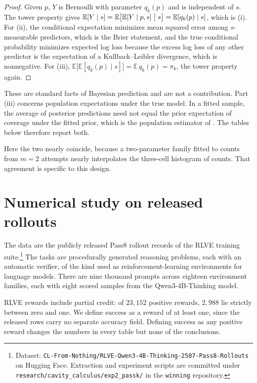\documentclass[11pt]{article}
\theoremstyle{itheads}
\begin{document}
\begin{proof}
Given $p$, $Y$ is Bernoulli with parameter $q_k(p)$ and is
independent of $s$. The tower property gives
$\mathbb{E}[Y \mid s]
= \mathbb{E}\bigl[\mathbb{E}[Y \mid p, s] \bigm| s\bigr]
= \mathbb{E}[q_k(p) \mid s]$, which is (i). For (ii), the
conditional expectation minimizes mean squared error among
$s$-measurable predictors, which is the Brier statement, and the
true conditional probability minimizes expected log loss because the
excess log loss of any other predictor is the expectation of a
Kullback--Leibler divergence, which is nonnegative. For (iii),
$\mathbb{E}\bigl[\mathbb{E}[q_k(p) \mid s]\bigr]
= \mathbb{E}\,q_k(p) = \pi_k$, the tower property again.
\end{proof}

These are standard facts of Bayesian prediction and are not a
contribution. Part (iii) concerns population expectations under the
true model. In a fitted sample, the average of posterior predictions
need not equal the prior expectation of coverage under the fitted
prior, which is the population estimator of \citet{kazdan2025}. The
tables below therefore report both.

Here the two nearly coincide, because a two-parameter family fitted
to counts from $m=2$ attempts nearly interpolates the three-cell
histogram of counts. That agreement is specific to this design.

\section{Numerical study on released rollouts}

The data are the publicly released Pass8 rollout records of the RLVE
training suite.\footnote{Dataset:
\texttt{CL-From-Nothing/RLVE-Qwen3-4B-Thinking-2507-Pass8-Rollouts}
on Hugging Face. Extraction and experiment scripts are committed
under \texttt{research/cavity\_calculus/exp2\_passk/} in the
\texttt{winning} repository.} The tasks are procedurally generated
reasoning problems, each with an automatic verifier, of the kind
used as reinforcement-learning environments for language models.
There are nine thousand prompts across eighteen environment
families, each with eight scored samples from the Qwen3-4B-Thinking
model.

RLVE rewards include partial credit: of $23{,}152$ positive rewards,
$2{,}988$ lie strictly between zero and one. We define success as a
reward of at least one, since the released rows carry no separate
accuracy field. Defining success as any positive reward changes the
numbers in every table but none of the conclusions.
\end{document}
